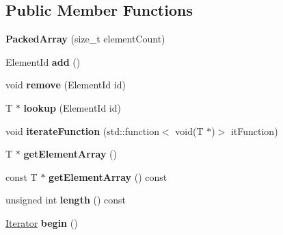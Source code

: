 \subsection*{Public Member Functions}
\begin{DoxyCompactItemize}
\item 
\hypertarget{class_packed_array_a717fdda304b2c1f1e5c0d73c9d596699}{}{\bfseries Packed\+Array} (size\+\_\+t element\+Count)\label{class_packed_array_a717fdda304b2c1f1e5c0d73c9d596699}

\item 
\hypertarget{class_packed_array_a186f80f552a63554810ace6ee70e7e07}{}Element\+Id {\bfseries add} ()\label{class_packed_array_a186f80f552a63554810ace6ee70e7e07}

\item 
\hypertarget{class_packed_array_a74de2ef74ee2e8529b8d1a585e2b2331}{}void {\bfseries remove} (Element\+Id id)\label{class_packed_array_a74de2ef74ee2e8529b8d1a585e2b2331}

\item 
\hypertarget{class_packed_array_a2028e1a60f64ea46a821dd6093e92127}{}T $\ast$ {\bfseries lookup} (Element\+Id id)\label{class_packed_array_a2028e1a60f64ea46a821dd6093e92127}

\item 
\hypertarget{class_packed_array_af26675ecb16de2bafcc1e2e453235772}{}void {\bfseries iterate\+Function} (std\+::function$<$ void(T $\ast$)$>$ it\+Function)\label{class_packed_array_af26675ecb16de2bafcc1e2e453235772}

\item 
\hypertarget{class_packed_array_ad4f4b041ee820b5913ae9cd2805b5b24}{}T $\ast$ {\bfseries get\+Element\+Array} ()\label{class_packed_array_ad4f4b041ee820b5913ae9cd2805b5b24}

\item 
\hypertarget{class_packed_array_ae553569818eddf37f9268d45611ebee9}{}const T $\ast$ {\bfseries get\+Element\+Array} () const \label{class_packed_array_ae553569818eddf37f9268d45611ebee9}

\item 
\hypertarget{class_packed_array_a27fbfb13af910af1c2bc0c640def2070}{}unsigned int {\bfseries length} () const \label{class_packed_array_a27fbfb13af910af1c2bc0c640def2070}

\item 
\hypertarget{class_packed_array_a1aa30eddbe633324a94d84768ec86c84}{}\hyperlink{class_packed_array_1_1_iterator}{Iterator} {\bfseries begin} ()\label{class_packed_array_a1aa30eddbe633324a94d84768ec86c84}


\end{DoxyCompactItemize}
